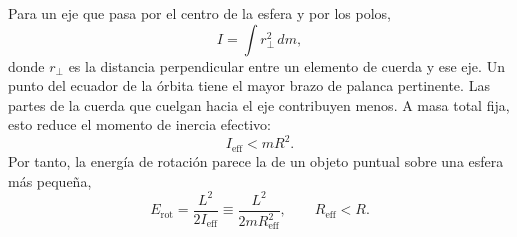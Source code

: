 Para un eje que pasa por el centro de la esfera y por los polos,
\begin{equation}
  I=\int r_\perp^2\,dm,
  \label{eq:l09-extended-inertia}
\end{equation}
donde \(r_\perp\) es la distancia perpendicular entre un elemento de cuerda y ese eje. Un punto del ecuador de la órbita tiene el mayor brazo de palanca pertinente. Las partes de la cuerda que cuelgan hacia el eje contribuyen menos. A masa total fija, esto reduce el momento de inercia efectivo:
\begin{equation}
  I_{\mathrm{eff}}<mR^2.
  \label{eq:l09-inertia-reduction}
\end{equation}
Por tanto, la energía de rotación parece la de un objeto puntual sobre una esfera más pequeña,
\begin{equation}
  E_{\mathrm{rot}}
  =\frac{L^2}{2I_{\mathrm{eff}}}
  \equiv \frac{L^2}{2mR_{\mathrm{eff}}^2},
  \qquad R_{\mathrm{eff}}<R.
  \label{eq:l09-effective-radius}
\end{equation}

\begin{classroomqa}
\end{classroomqa}

